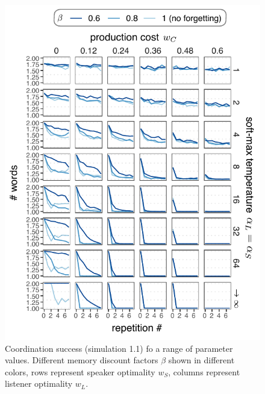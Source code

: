 \documentclass[11pt, floatsintext]{apa6}
\begin{document}
 \begin{figure}
\centering
    \includegraphics[scale=1.1]{conjuction_grid.pdf}
  \caption{Coordination success (simulation 1.1) fo a range of parameter values. Different memory discount factors $\beta$ shown in different colors, rows represent speaker optimality $w_S$, columns represent listener optimality $w_L$.}
  \label{fig:conjunction_grid}
\end{figure}
\end{document}
